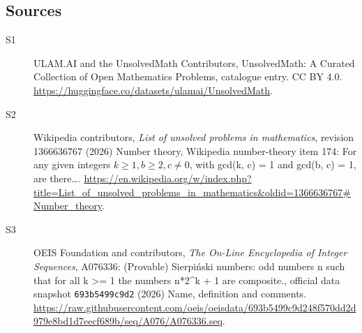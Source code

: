 \documentclass[11pt]{article}
\begin{document}
\subsection{Sources}
\begin{description}
\item[\hypertarget{source:statement:1}{S1}] ULAM.AI and the UnsolvedMath Contributors, UnsolvedMath: A Curated Collection of Open Mathematics Problems, catalogue entry. CC BY 4.0. \url{https://huggingface.co/datasets/ulamai/UnsolvedMath}.
\item[\hypertarget{source:statement:2}{S2}] Wikipedia contributors, \emph{List of unsolved problems in mathematics}, revision 1366636767 (2026) Number theory, Wikipedia number-theory item 174: For any given integers $k\geq 1, b\geq 2, c\neq 0$, with gcd(k, c) = 1 and gcd(b, c) = 1, are there…. \url{https://en.wikipedia.org/w/index.php?title=List_of_unsolved_problems_in_mathematics&oldid=1366636767#Number_theory}.
\item[\hypertarget{source:statement:3}{S3}] OEIS Foundation and contributors, \emph{The On-Line Encyclopedia of Integer Sequences}, A076336: (Provable) Sierpiński numbers: odd numbers n such that for all k >= 1 the numbers n*2\textasciicircum{}k + 1 are composite., official data snapshot \texttt{693b5499c9d2} (2026) Name, definition and comments. \url{https://raw.githubusercontent.com/oeis/oeisdata/693b5499c9d248f570dd2d979e8bd1d7eecf689b/seq/A076/A076336.seq}.
\end{description}
\label{end:statement}
\end{document}
